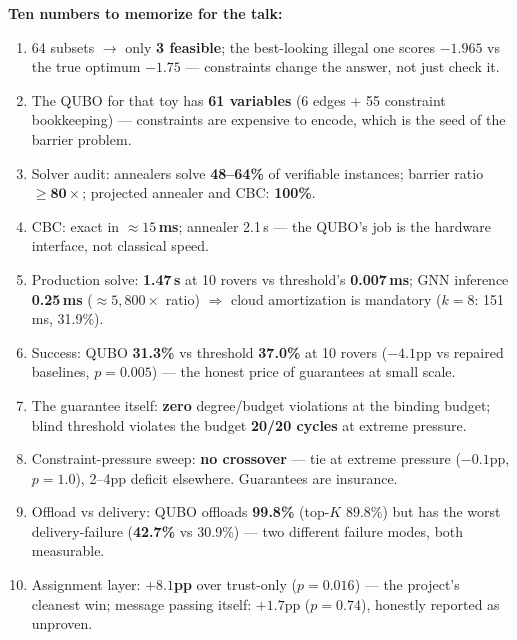 \documentclass[11pt]{article}
\newenvironment{goldcard}{%
  \def\FrameCommand{\fboxsep=8pt\fcolorbox{goldline}{goldbg}}%
  \MakeFramed{\advance\hsize-\width\FrameRestore}\noindent}{\endMakeFramed}
\begin{document}
\begin{goldcard}
\textbf{Ten numbers to memorize for the talk:}
\begin{enumerate}
\item 64 subsets $\rightarrow$ only \textbf{3 feasible}; the best-looking
illegal one scores \textbf{$-1.965$} vs the true optimum \textbf{$-1.75$}
--- constraints change the answer, not just check it.
\item The QUBO for that toy has \textbf{61 variables} (6 edges + 55
constraint bookkeeping) --- constraints are expensive to encode, which is
the seed of the barrier problem.
\item Solver audit: annealers solve \textbf{48--64\%} of verifiable
instances; barrier ratio $\ge \textbf{80}\times$; projected annealer and
CBC: \textbf{100\%}.
\item CBC: exact in \textbf{$\approx15$\,ms}; annealer 2.1\,s --- the QUBO's
job is the hardware interface, not classical speed.
\item Production solve: \textbf{1.47\,s} at 10 rovers vs threshold's
\textbf{0.007\,ms}; GNN inference \textbf{0.25\,ms} ($\approx5{,}800\times$
ratio) $\Rightarrow$ cloud amortization is mandatory ($k{=}8$: 151\,ms,
31.9\%).
\item Success: QUBO \textbf{31.3\%} vs threshold \textbf{37.0\%} at 10
rovers ($-4.1$pp vs repaired baselines, $p{=}0.005$) --- the honest price
of guarantees at small scale.
\item The guarantee itself: \textbf{zero} degree/budget violations at the
binding budget; blind threshold violates the budget \textbf{20/20 cycles}
at extreme pressure.
\item Constraint-pressure sweep: \textbf{no crossover} --- tie at extreme
pressure ($-0.1$pp, $p{=}1.0$), 2--4pp deficit elsewhere. Guarantees are
insurance.
\item Offload vs delivery: QUBO offloads \textbf{99.8\%} (top-$K$ 89.8\%)
but has the worst delivery-failure (\textbf{42.7\%} vs 30.9\%) --- two
different failure modes, both measurable.
\item Assignment layer: \textbf{$+8.1$pp} over trust-only ($p{=}0.016$) ---
the project's cleanest win; message passing itself: $+1.7$pp ($p{=}0.74$),
honestly reported as unproven.
\end{enumerate}
\end{goldcard}
\end{document}

